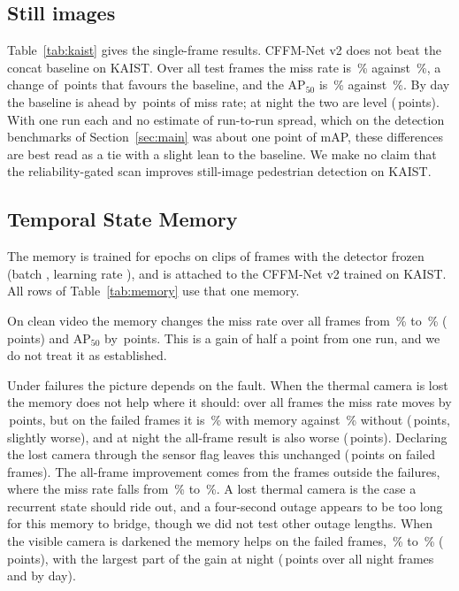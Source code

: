 \subsection{Still images}
\label{sec:kaiststills}

Table~\ref{tab:kaist} gives the single-frame results. CFFM-Net v2 does not beat the concat baseline on KAIST. Over all test frames the miss rate is \kstCffmAllMr{}\,\% against \kstConcatAllMr{}\,\%, a change of \kstMarginAllMr{}\,points that favours the baseline, and the AP$_{50}$ is \kstCffmAllApFifty{}\,\% against \kstConcatAllApFifty{}\,\%. By day the baseline is ahead by \kstMarginDayMr{}\,points of miss rate; at night the two are level (\kstMarginNightMr{}\,points). With one run each and no estimate of run-to-run spread, which on the detection benchmarks of Section~\ref{sec:main} was about one point of mAP, these differences are best read as a tie with a slight lean to the baseline. We make no claim that the reliability-gated scan improves still-image pedestrian detection on KAIST.

\subsection{Temporal State Memory}
\label{sec:kaistmemory}
The memory is trained for \cfgMemEpochs{} epochs on clips of \cfgClipLen{} frames with the detector frozen (batch \cfgMemBatch{}, learning rate \cfgMemLr{}), and is attached to the CFFM-Net v2 trained on KAIST. All rows of Table~\ref{tab:memory} use that one memory.



On clean video the memory changes the miss rate over all frames from \memCleanImageAllMr{}\,\% to \memCleanMemoryAllMr{}\,\% (\memChangeCleanAllMr{}\,points) and AP$_{50}$ by \memChangeCleanAllApFifty{}\,points. This is a gain of half a point from one run, and we do not treat it as established.

Under failures the picture depends on the fault. When the thermal camera is lost the memory does not help where it should: over all frames the miss rate moves by \memChangeThermalLostAllMr{}\,points, but on the failed frames it is \memThermalLostMemoryFailedMr{}\,\% with memory against \memThermalLostImageFailedMr{}\,\% without (\memChangeThermalLostFailedMr{}\,points, slightly worse), and at night the all-frame result is also worse (\memChangeThermalLostNightMr{}\,points). Declaring the lost camera through the sensor flag leaves this unchanged (\memChangeThermalLostFlaggedFailedMr{}\,points on failed frames). The all-frame improvement comes from the frames outside the failures, where the miss rate falls from \memThermalLostImageHealthyMr{}\,\% to \memThermalLostMemoryHealthyMr{}\,\%. A lost thermal camera is the case a recurrent state should ride out, and a four-second outage appears to be too long for this memory to bridge, though we did not test other outage lengths. When the visible camera is darkened the memory helps on the failed frames, \memVisibleDarkImageFailedMr{}\,\% to \memVisibleDarkMemoryFailedMr{}\,\% (\memChangeVisibleDarkFailedMr{}\,points), with the largest part of the gain at night (\memChangeVisibleDarkNightMr{}\,points over all night frames and \memChangeVisibleDarkDayMr{} by day).

